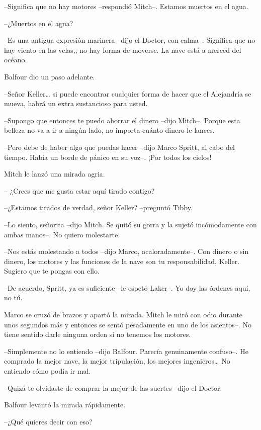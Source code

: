 {--Significa que no hay motores --respondió Mitch--. Estamos muertos en
el agua.}

{--¿Muertos en el agua?}

{--Es una antigua expresión marinera --dijo el Doctor, con calma--.
 Significa que no hay viento en las velas,, no hay forma de moverse. La
nave está a merced del océano.}

{Balfour dio un paso adelante.}

{--Señor Keller\ldots{} si puede encontrar cualquier forma de hacer que
el Alejandría se mueva, habrá un extra sustancioso para usted.}

{--Supongo que entonces te puedo ahorrar el dinero --dijo Mitch--. Porque
 esta belleza no va a ir a ningún lado, no importa cuánto dinero le
lances.}

{--Pero debe de haber algo que puedas hacer --dijo Marco Spritt, al cabo
 del tiempo. Había un borde de pánico en su voz--. ¡Por todos los
cielos!}

{Mitch le lanzó una mirada agria.}

{-- ¿Crees que me gusta estar aquí tirado contigo?}

{--¿Estamos tirados de verdad, señor Keller? --preguntó Tibby.}

{--Lo siento, señorita --dijo Mitch. Se quitó su gorra y la sujetó
incómodamente con ambas manos--. No quiero molestarte.}

{--Nos estás molestando a todos --dijo Marco, acaloradamente--. Con
 dinero o sin dinero, los motores y las funciones de la nave son tu
responsabilidad, Keller. Sugiero que te pongas con ello.}

{--De acuerdo, Spritt, ya es suficiente --le espetó Laker--. Yo doy las
órdenes aquí, no tú.}

{Marco se cruzó de brazos y apartó la mirada. Mitch le miró con odio
 durante unos segundos más y entonces se sentó pesadamente en uno de los
 asientos--. No tiene sentido darle ninguna orden si no tenemos los
motores.}

{--Simplemente no lo entiendo --dijo Balfour. Parecía genuinamente
 confuso--. He comprado la mejor nave, la mejor tripulación, los mejores
 ingenieros\ldots{} No entiendo cómo podía ir mal.}

{--Quizá te olvidaste de comprar la mejor de las suertes --dijo el
Doctor.}

{Balfour levantó la mirada rápidamente.}

{--¿Qué quieres decir con eso?}

